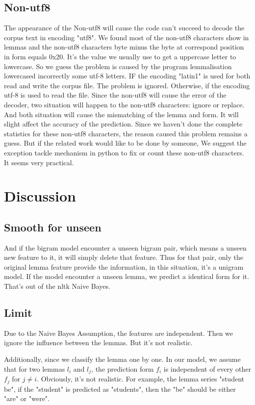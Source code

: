 \documentclass[a4paper]{article}
\begin{document}
\subsection*{Non-utf8}
The appearance  of the Non-utf8 will cause the code can't succeed to decode the corpus text in encoding "utf8". We found most of the non-utf8 characters show in lemmas and the non-utf8 characters byte minus the byte at correspond position in form equals 0x20. It's the value we usually use to get a uppercase letter to lowercase. So we guess the problem is caused by the program lemmalisation lowercased incorrectly some utf-8 letters. IF the encoding "latin1" is used for both read and write the corpus file. The problem is ignored. Otherwise, if the encoding utf-8 is used to read the file. Since the non-utf8 will cause the error of the decoder, two situation will happen to the non-utf8 characters: ignore or replace. And both situation will cause the mismatching of the lemma and form. It will slight affect the accuracy of the prediction. 
Since we haven't done the complete statistics for these non-utf8 characters, the reason caused this problem remains a guess. But if the related work would like to be done by someone, We suggest the exception tackle mechanism in python to fix or count these non-utf8 characters. It seems very practical.  

\section{Discussion}
\subsection*{Smooth for unseen}
And if the bigram model encounter a unseen bigram pair, which means a unseen new feature to it, it will simply delete that feature. Thus for that pair, only the original lemma feature provide the information, in this situation, it's a unigram model.
If the model encounter a unseen lemma, we predict a identical form for it. That's out of the nltk Naive Bayes. 
\subsection*{Limit}
Due to the Naive Bayes Assumption, the features are independent. Then we ignore the influence between the lemmas. But it's not realistic. 

Additionally, since we classify the lemma one by one. In our model, we assume that for two lemmas $l_i$ and $l_{j}$, the prediction form $f_{i}$ is independent of every other $f_{j}$ for $j \neq i$. Obviously, it's not realistic. For example, the lemma series "student be", if the "student" is predicted as "students", then the "be" should be either "are" or "were".
\end{document}

